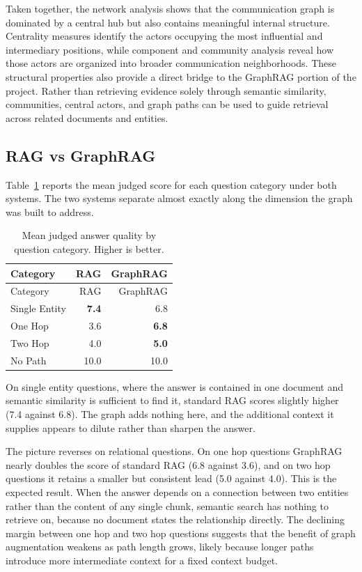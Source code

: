 \documentclass[
  letterpaper,
  DIV=11,
  numbers=noendperiod]{scrartcl}
\begin{document}
Taken together, the network analysis shows that the communication graph
is dominated by a central hub but also contains meaningful internal
structure. Centrality measures identify the actors occupying the most
influential and intermediary positions, while component and community
analysis reveal how those actors are organized into broader
communication neighborhoods. These structural properties also provide a
direct bridge to the GraphRAG portion of the project. Rather than
retrieving evidence solely through semantic similarity, communities,
central actors, and graph paths can be used to guide retrieval across
related documents and entities.

\subsection{RAG vs GraphRAG}\label{rag-vs-graphrag}

Table~\ref{tbl-ragvsgraph} reports the mean judged score for each
question category under both systems. The two systems separate almost
exactly along the dimension the graph was built to address.

\begin{longtable}[]{@{}lrr@{}}
\caption{Mean judged answer quality by question category. Higher is
better. }\label{tbl-ragvsgraph}\tabularnewline
\toprule\noalign{}
Category & RAG & GraphRAG \\
\midrule\noalign{}
\endfirsthead
\toprule\noalign{}
Category & RAG & GraphRAG \\
\midrule\noalign{}
\endhead
\bottomrule\noalign{}
\endlastfoot
Single Entity & \textbf{7.4} & 6.8 \\
One Hop & 3.6 & \textbf{6.8} \\
Two Hop & 4.0 & \textbf{5.0} \\
No Path & 10.0 & 10.0 \\
\end{longtable}

On single entity questions, where the answer is contained in one
document and semantic similarity is sufficient to find it, standard RAG
scores slightly higher (7.4 against 6.8). The graph adds nothing here,
and the additional context it supplies appears to dilute rather than
sharpen the answer.

The picture reverses on relational questions. On one hop questions
GraphRAG nearly doubles the score of standard RAG (6.8 against 3.6), and
on two hop questions it retains a smaller but consistent lead (5.0
against 4.0). This is the expected result. When the answer depends on a
connection between two entities rather than the content of any single
chunk, semantic search has nothing to retrieve on, because no document
states the relationship directly. The declining margin between one hop
and two hop questions suggests that the benefit of graph augmentation
weakens as path length grows, likely because longer paths introduce more
intermediate context for a fixed context budget.
\end{document}
